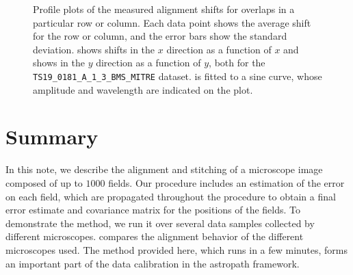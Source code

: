 \documentclass{article}
\begin{document}
\begin{figure}[ht]
\begin{subfigure}{0.49\linewidth}
		\caption{}
		\label{fig:sinewaveyyAKY}
	\end{subfigure}
	\caption{Profile plots of the measured alignment shifts for overlaps in a particular row or column.  Each data point shows the average shift for the row or column, and the error bars show the standard deviation.   shows shifts in the $x$ direction as a function of $x$ and  shows in the $y$ direction as a function of $y$, both for the \texttt{TS19\_0181\_A\_1\_3\_BMS\_MITRE} dataset.   is fitted to a sine curve, whose amplitude and wavelength are indicated on the plot.}
	\label{fig:sinewavesAKY}
\end{figure}

\clearpage

\section{Summary}

In this note, we describe the alignment and stitching of a microscope image composed of up to $1000$ fields.  Our procedure includes an estimation of the error on each field, which are propagated throughout the procedure to obtain a final error estimate and covariance matrix for the positions of the fields.  To demonstrate the method, we run it over several data samples collected by different microscopes.   compares the alignment behavior of the different microscopes used.  The method provided here, which runs in a few minutes, forms an important part of the data calibration in the astropath framework.
\end{document}
